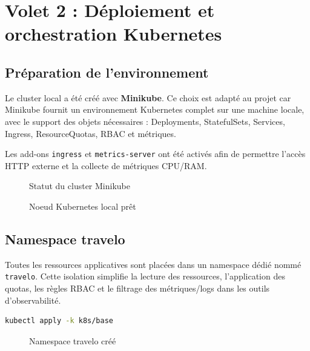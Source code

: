 \documentclass[11pt,a4paper]{article}
\begin{document}


\section{Volet 2 : Déploiement et orchestration Kubernetes}

\subsection{Préparation de l'environnement}

Le cluster local a été créé avec \textbf{Minikube}. Ce choix est adapté au projet car Minikube fournit un environnement Kubernetes complet sur une machine locale, avec le support des objets nécessaires : Deployments, StatefulSets, Services, Ingress, ResourceQuotas, RBAC et métriques.

Les add-ons \texttt{ingress} et \texttt{metrics-server} ont été activés afin de permettre l'accès HTTP externe et la collecte de métriques CPU/RAM.

\begin{figure}[H]
    \centering
    
    \caption{Statut du cluster Minikube}
\end{figure}

\begin{figure}[H]
    \centering
    
    \caption{Noeud Kubernetes local prêt}
\end{figure}

\subsection{Namespace travelo}

Toutes les ressources applicatives sont placées dans un namespace dédié nommé \texttt{travelo}. Cette isolation simplifie la lecture des ressources, l'application des quotas, les règles RBAC et le filtrage des métriques/logs dans les outils d'observabilité.

\begin{lstlisting}[language=bash, caption={Déploiement des manifestes Kubernetes}]
kubectl apply -k k8s/base
\end{lstlisting}

\begin{figure}[H]
    \centering
    
    \caption{Namespace travelo créé}
\end{figure}
\end{document}
